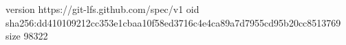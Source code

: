 version https://git-lfs.github.com/spec/v1
oid sha256:dd410109212cc353e1cbaa10f58ed3716c4e4ca89a7d7955cd95b20cc8513769
size 98322
